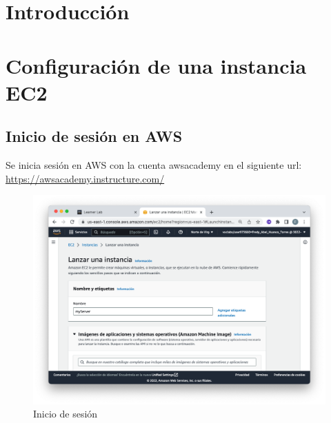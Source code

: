 %
%

\section{Introducción}

\lipsum[2-4]

\section{Configuración de una instancia EC2}
\subsection{Inicio de sesión en AWS}

Se inicia sesión en AWS con la cuenta awsacademy en el siguiente url: \href{https://awsacademy.instructure.com/}{https://awsacademy.instructure.com/}

\begin{figure}[h]
	\centering
	\includegraphics[scale=.3] {img/01}
	\caption{Inicio de sesión}
	\label{fig:0}	
\end{figure} 


